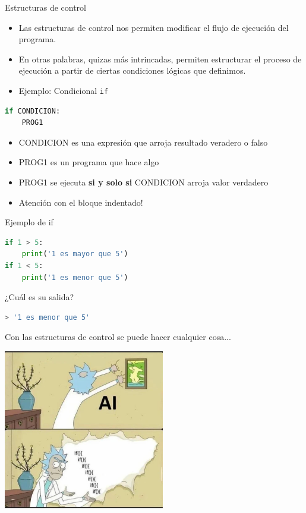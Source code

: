 \documentclass{beamer}
\begin{document}
\begin{frame}[fragile]{Estructuras de control}
\begin{itemize}
    \item Las estructuras de control nos permiten  modificar el flujo de ejecución del programa. \pause
    \item En otras palabras, quizas más intrincadas, permiten estructurar el proceso de ejecución a partir de ciertas condiciones lógicas que definimos. \pause
    \item Ejemplo: Condicional \texttt{if} \pause
\end{itemize}

\begin{lstlisting}[language=Python]
if CONDICION:
    PROG1 
\end{lstlisting} \pause

\begin{itemize}
    \item CONDICION es una expresión que arroja resultado veradero o falso
    \item PROG1 es un programa que hace algo
    \item PROG1 se ejecuta \textbf{si y solo si} CONDICION arroja valor verdadero \pause
    \item Atención con el bloque indentado!
\end{itemize}
\end{frame}

\begin{frame}[fragile]{Ejemplo de if}
\begin{lstlisting}[language=Python]
if 1 > 5:
    print('1 es mayor que 5')
if 1 < 5:
    print('1 es menor que 5') 
\end{lstlisting} \pause

¿Cuál es su salida? \pause
\begin{lstlisting}[language=Python]
> '1 es menor que 5'
\end{lstlisting}
\end{frame}

\begin{frame}{Con las estructuras de control se puede hacer cualquier cosa...} \pause
\begin{center}
\includegraphics[height=7cm, scale=0.5]{rick_ai.jpeg}
\end{center}
\end{frame}
\end{document}
